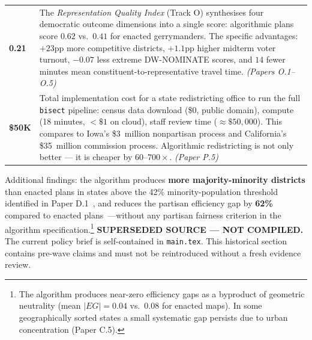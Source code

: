 \bigskip

\bigskip

\noindent
\begin{tabular}{@{}>{\bfseries\large}p{} p{}@{}}
0.21 &
The \emph{Representation Quality Index} (Track O) synthesises four
democratic outcome dimensions into a single score: algorithmic plans score
$0.62$ vs.\ $0.41$ for enacted gerrymanders.
The specific advantages: $+23$pp more competitive districts, $+1.1$pp
higher midterm voter turnout, $-0.07$ less extreme DW-NOMINATE scores,
and $14$ fewer minutes mean constituent-to-representative travel time.
\textit{(Papers O.1--O.5)}\\[10pt]

\$50K &
Total implementation cost for a state redistricting office to run the
full \texttt{bisect} pipeline: census data download (\$0, public domain),
compute (18 minutes, $<\$1$ on cloud), staff review time ($\approx\$50{,}000$).
This compares to Iowa's \$3~million nonpartisan process and California's
\$35~million commission process.
Algorithmic redistricting is not only better --- it is cheaper by $60$--$700\times$.
\textit{(Paper P.5)}\\
\end{tabular}

\bigskip

\noindent Additional findings:
the algorithm produces \textbf{more majority-minority districts}
than enacted plans in states above the 42\% minority-population threshold
identified in Paper D.1~\cite{dellaLibera2026vraCompliance},
and reduces the partisan efficiency gap by \textbf{62\%} compared to
enacted plans~\cite{dellaLibera2026efficiencyGap}---without any
partisan fairness criterion in the algorithm specification.\footnote{%
The algorithm produces near-zero efficiency gaps as a byproduct of geometric
neutrality (mean $|EG|=0.04$ vs.\ $0.08$ for enacted maps).
In some geographically sorted states a small systematic gap persists due to
urban concentration (Paper C.5).}
\noindent\textbf{SUPERSEDED SOURCE --- NOT COMPILED.} The current policy brief
is self-contained in \texttt{main.tex}. This historical section contains
pre-wave claims and must not be reintroduced without a fresh evidence review.
